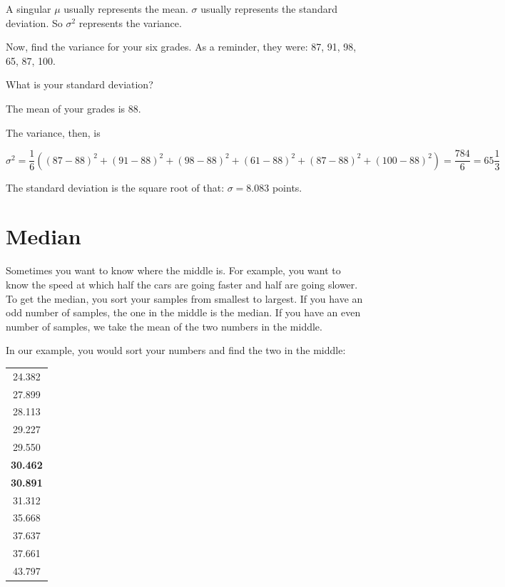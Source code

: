 A singular $\mu$ usually represents the mean. $\sigma$ usually represents
the standard deviation. So $\sigma^2$ represents the variance.

\begin{Exercise}[title={Variance of Grades}, label=grades_variance]

  Now, find the variance for your six grades. As a reminder, they were: 87, 91, 98, 65, 87, 100.

  What is your standard deviation?

\end{Exercise}
\begin{Answer}[ref=grades_variance]

  The mean of your grades is $88$.

  The variance, then, is

  $$\sigma^2 = \frac{1}{6} \left((87 - 88)^2 + (91 - 88)^2 + (98 - 88)^2 + (61 - 88)^2 + (87 - 88)^2 + (100 - 88)^2 \right) = \frac{784}{6} = 65 \frac{1}{3}$$

  The standard deviation is the square root of that: $\sigma = 8.083$ points.
  
\end{Answer}


\section{Median}

Sometimes you want to know where the middle is. For example, you want
to know the speed at which half the cars are going faster and half are
going slower. To get the median, you sort your samples from smallest
to largest. If you have an odd number of samples, the one in the
middle is the median. If you have an even number of samples, we take
the mean of the two numbers in the middle.

In our example, you would sort your numbers and find the two in the middle:

\begin{tabular}{c}
24.382\\
27.899\\
28.113\\
29.227\\
29.550\\
\hline
\textbf{30.462}\\
\textbf{30.891}\\
\hline 
31.312\\
35.668\\
37.637\\
37.661\\
43.797\\
\end{tabular}

